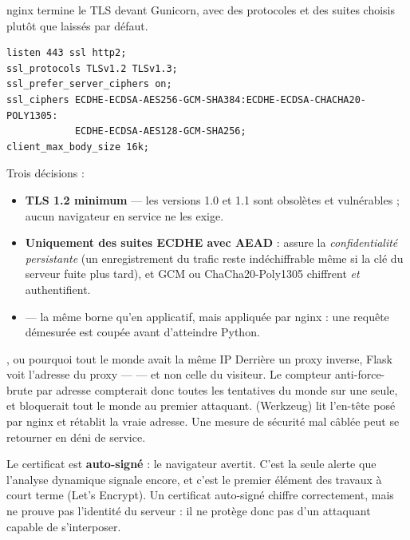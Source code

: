 \parade
nginx termine le TLS devant Gunicorn, avec des protocoles et des suites
choisis plutôt que laissés par défaut.

\danslecode
\begin{lstlisting}
listen 443 ssl http2;
ssl_protocols TLSv1.2 TLSv1.3;
ssl_prefer_server_ciphers on;
ssl_ciphers ECDHE-ECDSA-AES256-GCM-SHA384:ECDHE-ECDSA-CHACHA20-POLY1305:
            ECDHE-ECDSA-AES128-GCM-SHA256;
client_max_body_size 16k;
\end{lstlisting}

Trois décisions :

\begin{itemize}[leftmargin=14pt,itemsep=3pt]
\item \textbf{TLS 1.2 minimum} --- les versions 1.0 et 1.1 sont obsolètes et
      vulnérables ; aucun navigateur en service ne les exige.
\item \textbf{Uniquement des suites ECDHE avec AEAD} :  assure la
      \emph{confidentialité persistante} (un enregistrement du trafic reste
      indéchiffrable même si la clé du serveur fuite plus tard), et GCM ou
      ChaCha20-Poly1305 chiffrent \emph{et} authentifient.
\item {} --- la même borne qu'en applicatif, mais
      appliquée par nginx : une requête démesurée est coupée avant d'atteindre
      Python.
\end{itemize}

\begin{notion}{, ou pourquoi tout le monde avait la même IP}
Derrière un proxy inverse, Flask voit l'adresse du proxy --- 
--- et non celle du visiteur. Le compteur anti-force-brute par adresse
compterait donc toutes les tentatives du monde sur une seule, et bloquerait
tout le monde au premier attaquant.  (Werkzeug) lit l'en-tête
 posé par nginx et rétablit la vraie adresse. Une mesure
de sécurité mal câblée peut se retourner en déni de service.
\end{notion}

\limite
Le certificat est \textbf{auto-signé} : le navigateur avertit. C'est la seule
alerte que l'analyse dynamique signale encore, et c'est le premier élément des
travaux à court terme (Let's Encrypt). Un certificat auto-signé chiffre
correctement, mais ne prouve pas l'identité du serveur : il ne protège donc pas
d'un attaquant capable de s'interposer.
